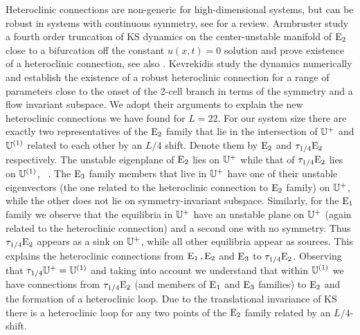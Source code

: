 Heteroclinic connections are non-generic for high-dimensional
systems, but can be robust in systems with continuous
symmetry, see  for a review.
Armbruster \etal{} study a fourth order truncation
of KS dynamics on the center-unstable manifold of $\mathrm{E}_{2}$
close to a bifurcation off the constant $u(x,t)=0$ solution
and prove existence of a heteroclinic connection, see also
. Kevrekidis \etal{} study the
dynamics numerically and establish the existence of a robust
heteroclinic connection for a range of parameters close to
the onset of the 2-cell branch in terms of the symmetry and a
flow invariant subspace. We adopt their arguments to explain
the new heteroclinic connections we have found for $L=22$.
For our system size there are exactly two representatives of
the $\mathrm{E}_{2}$ family that lie in the intersection of $\mathbb{U}^+$
and $\mathbb{U}^{(1)}$ related to each other by an $L/4$ shift.
Denote them by $\mathrm{E}_{2}$ and $\tau_{1/4}\mathrm{E}_{2}$
respectively. The unstable eigenplane of $\mathrm{E}_{2}$ lies on
$\mathbb{U}^+$ while that of $\tau_{1/4}\mathrm{E}_{2}$ lies on
$\mathbb{U}^{(1)}$, \cf\ . The $\mathrm{E}_{3}$ family
members that live in $\mathbb{U}^+$ have one of their unstable
eigenvectors (the one related to the heteroclinic connection
to $\mathrm{E}_{2}$ family)  on $\mathbb{U}^+$, while the other does not
lie on symmetry-invariant subspace. Similarly, for the
$\mathrm{E}_{1}$ family we observe that the equilibria in $\mathbb{U}^+$
have an unstable plane on $\mathbb{U}^+$ (again related to the
heteroclinic connection) and a second one with no symmetry.
Thus $\tau_{1/4}\mathrm{E}_{2}$ appears as a sink on $\mathbb{U}^+$,
while all other equilibria appear as sources. This explains
the heteroclinic connections from $\mathrm{E}_{1}\,,\mathrm{E}_{2}$ and
$\mathrm{E}_{3}$ to $\tau_{1/4}\mathrm{E}_{2}$. Observing that
$\tau_{1/4} \mathbb{U}^+= \mathbb{U}^{(1)}$ and taking into account
 we understand that within $\mathbb{U}^{(1)}$ we
have connections from $\tau_{1/4}\mathrm{E}_{2}$ (and members of
$\mathrm{E}_{1}$ and $\mathrm{E}_{3}$ families) to $\mathrm{E}_{2}$ and the
formation of a heteroclinic loop. Due to the translational
invariance of KS there is a heteroclinic loop for any two
points of the $\mathrm{E}_{2}$ family related by an $L/4$-shift.

